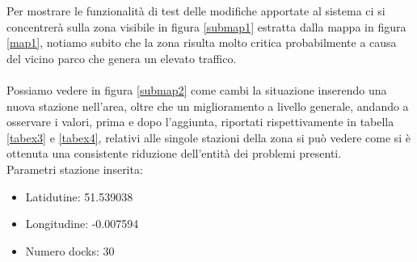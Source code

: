 \documentclass[a4paper, 12pt]{article}
\begin{document}
Per mostrare le funzionalità di test delle modifiche apportate al sistema ci si concentrerà sulla zona visibile in figura \ref{submap1} estratta dalla mappa in figura \ref{map1}, notiamo subito che la zona risulta molto critica probabilmente a causa del vicino parco che genera un elevato traffico.\\\\
Possiamo vedere in figura \ref{submap2} come cambi la situazione inserendo una nuova stazione nell'area, oltre che un miglioramento a livello generale, andando a osservare i valori, prima e dopo l'aggiunta, riportati rispettivamente in tabella \ref{tabex3} e \ref{tabex4}, relativi alle singole stazioni della zona si può vedere come si è ottenuta una consistente riduzione dell'entità dei problemi presenti.\\
Parametri stazione inserita:
	\begin{itemize}
		\item Latidutine: 51.539038
		\item Longitudine: -0.007594
		\item Numero docks: 30
	\end{itemize}
\end{document}

